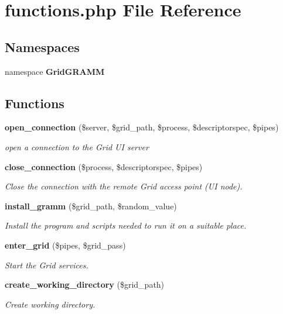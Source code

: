 \section{functions.php File Reference}
\label{functions_8php}
\subsection*{Namespaces}
\begin{CompactItemize}
\item 
namespace {\bf Grid\-GRAMM}
\end{CompactItemize}
\subsection*{Functions}
\begin{CompactItemize}
\item 
{\bf open\_\-connection} (\$server, \$grid\_\-path, \$process, \$descriptorspec, \$pipes)
\begin{CompactList}\small\item\em open a connection to the Grid UI server \item\end{CompactList}\item 
{\bf close\_\-connection} (\$process, \$descriptorspec, \$pipes)
\begin{CompactList}\small\item\em Close the connection with the remote Grid access point (UI node). \item\end{CompactList}\item 
{\bf install\_\-gramm} (\$grid\_\-path, \$random\_\-value)
\begin{CompactList}\small\item\em Install the program and scripts needed to run it on a suitable place. \item\end{CompactList}\item 
{\bf enter\_\-grid} (\$pipes, \$grid\_\-pass)
\begin{CompactList}\small\item\em Start the Grid services. \item\end{CompactList}\item 
{\bf create\_\-working\_\-directory} (\$grid\_\-path)
\begin{CompactList}\small\item\em Create working directory. \item\end{CompactList}\item 

\end{CompactItemize}
